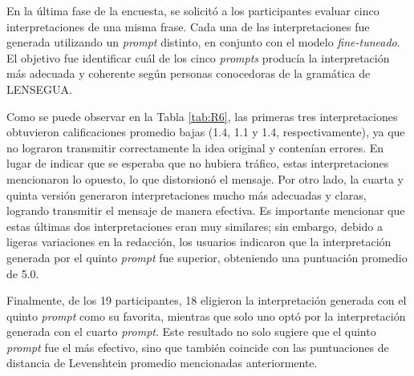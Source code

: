 En la última fase de la encuesta, se solicitó a los participantes evaluar cinco interpretaciones de una misma frase. Cada una de las interpretaciones fue generada utilizando un \textit{prompt} distinto, en conjunto con el modelo \textit{fine-tuneado}. El objetivo fue identificar cuál de los cinco \textit{prompts} producía la interpretación más adecuada y coherente según personas conocedoras de la gramática de LENSEGUA. 

Como se puede observar en la Tabla \ref{tab:R6}, las primeras tres interpretaciones obtuvieron calificaciones promedio bajas (1.4, 1.1 y 1.4, respectivamente), ya que no lograron transmitir correctamente la idea original y contenían errores. En lugar de indicar que se esperaba que no hubiera tráfico, estas interpretaciones mencionaron lo opuesto, lo que distorsionó el mensaje. Por otro lado, la cuarta y quinta versión generaron interpretaciones mucho más adecuadas y claras, logrando transmitir el mensaje de manera efectiva. Es importante mencionar que estas últimas dos interpretaciones eran muy similares; sin embargo, debido a ligeras variaciones en la redacción, los usuarios indicaron que la interpretación generada por el quinto \textit{prompt} fue superior, obteniendo una puntuación promedio de 5.0.

Finalmente, de los 19 participantes, 18 eligieron la interpretación generada con el quinto \textit{prompt} como su favorita, mientras que solo uno optó por la interpretación generada con el  cuarto \textit{prompt}. Este resultado no solo sugiere que el quinto \textit{prompt} fue el más efectivo, sino que también coincide con las puntuaciones de distancia de Levenshtein promedio mencionadas anteriormente. 

